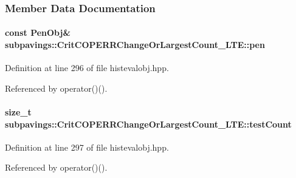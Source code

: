 \subsubsection{\-Member \-Data \-Documentation}
\hypertarget{classsubpavings_1_1CritCOPERRChangeOrLargestCount__LTE_a1aa6dd39f856481128f0f854d755fc10}{
\paragraph[{pen}]{\setlength{\rightskip}{0pt plus 5cm}const {\bf \-Pen\-Obj}\& {\bf subpavings\-::\-Crit\-C\-O\-P\-E\-R\-R\-Change\-Or\-Largest\-Count\-\_\-\-L\-T\-E\-::pen}}}\label{classsubpavings_1_1CritCOPERRChangeOrLargestCount__LTE_a1aa6dd39f856481128f0f854d755fc10}


\-Definition at line 296 of file histevalobj.\-hpp.



\-Referenced by operator()().

\hypertarget{classsubpavings_1_1CritCOPERRChangeOrLargestCount__LTE_a225e0e6f64b91c57530a1e5157d21be8}{
\paragraph[{test\-Count}]{\setlength{\rightskip}{0pt plus 5cm}size\-\_\-t {\bf subpavings\-::\-Crit\-C\-O\-P\-E\-R\-R\-Change\-Or\-Largest\-Count\-\_\-\-L\-T\-E\-::test\-Count}}}\label{classsubpavings_1_1CritCOPERRChangeOrLargestCount__LTE_a225e0e6f64b91c57530a1e5157d21be8}


\-Definition at line 297 of file histevalobj.\-hpp.



\-Referenced by operator()().

